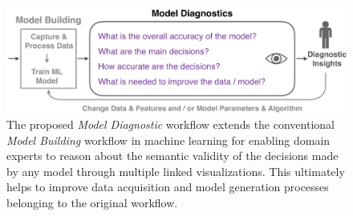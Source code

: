 \begin{figure}[t]
\centering
\includegraphics[width=\textwidth]{figs/workflow_large}
\caption[The model diagnostic workflow.]{
The proposed \textit{Model Diagnostic} workflow extends the conventional \textit{Model Building} workflow in machine learning for enabling domain experts to reason about the semantic validity of the decisions made by any model through multiple linked visualizations.
This ultimately helps to improve data acquisition and model generation processes belonging to the original workflow.
}
\label{figs:workflow_intro}
\end{figure}